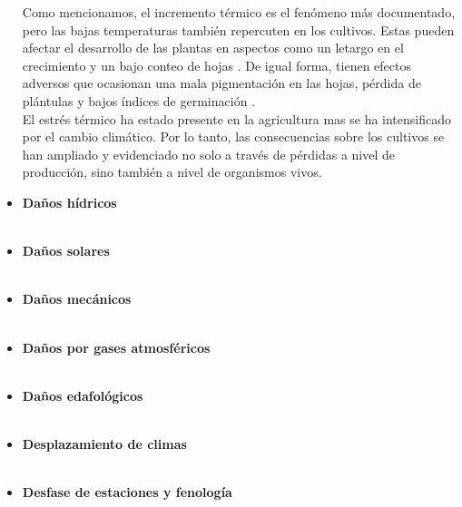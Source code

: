 \begin{itemize}[leftmargin=0cm, itemsep=0.5 cm]
Como mencionamos, el incremento térmico es el fenómeno más documentado, pero las bajas temperaturas también repercuten en los cultivos. Estas pueden afectar el desarrollo de las plantas en aspectos como un letargo en el crecimiento y un bajo conteo de hojas \cite{Ngoune_2020}. De igual forma, tienen efectos adversos que ocasionan una mala pigmentación en las hojas, pérdida de plántulas y bajos índices de germinación \cite{Zhang_2020}.\\

El estrés térmico ha estado presente en la agricultura mas se ha intensificado por el cambio climático. Por lo tanto, las consecuencias sobre los cultivos se han ampliado y evidenciado no solo a través de pérdidas a nivel de producción, sino también a nivel de organismos vivos.










\item[]\textbf{Daños hídricos\\}\\
\item[]\textbf{Daños solares\\}\\
\item[]\textbf{Daños mecánicos\\}\\
\item[]\textbf{Daños por gases atmosféricos\\}\\
\item[]\textbf{Daños edafológicos\\}\\
\item[]\textbf{Desplazamiento de climas\\}\\
\item[]\textbf{Desfase de estaciones y fenología\\}\\
\end{itemize}

